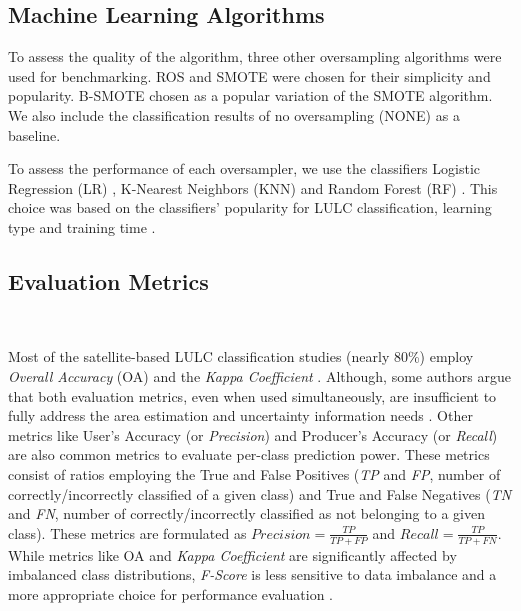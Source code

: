\documentclass[remotesensing,article,submit,moreauthors,pdftex]{Definitions/mdpi}
\begin{document}
\begin{paracol}{2}
\linenumbers
\switchcolumn

\subsection{Machine Learning Algorithms}

To assess the quality of the  algorithm,
three other oversampling algorithms were used for benchmarking. ROS and SMOTE
were chosen for their simplicity and popularity. B-SMOTE chosen as a popular
variation of the SMOTE algorithm. We also include the classification results
of no oversampling (NONE) as a baseline.

To assess the performance of each oversampler, we use the classifiers Logistic
Regression (LR) \cite{Nelder1972}, K-Nearest Neighbors (KNN)
\cite{Cover1967} and Random Forest (RF)
\cite{Liaw2002}. This choice was based on the classifiers' popularity for LULC
classification, learning type and training time \cite{Maxwell2018,Gavade2019}.

\subsection{Evaluation Metrics}~\label{sec:evaluation-metrics}

Most of the satellite-based LULC classification studies (nearly 80\%) employ
\textit{Overall Accuracy} (OA) and the \textit{Kappa Coefficient}
\cite{Gavade2019}. Although, some authors argue that both evaluation metrics,
even when used simultaneously, are insufficient to fully address the area
estimation and uncertainty information needs \cite{Olofsson2013,Pontius2011}.
Other metrics like User's Accuracy (or \textit{Precision}) and Producer's
Accuracy (or \textit{Recall}) are also common metrics to evaluate per-class
prediction power. These metrics consist of ratios employing the True and False
Positives (\textit{TP} and \textit{FP}, number of correctly/incorrectly
classified of a given class) and True and
False Negatives (\textit{TN} and \textit{FN}, number of correctly/incorrectly
classified as not belonging to a given
class). These metrics are formulated as $Precision = \frac{TP}{TP+FP}$ and
$Recall = \frac{TP}{TP+FN}$. While metrics like OA and \textit{Kappa
Coefficient} are significantly affected by imbalanced class distributions,
\textit{F-Score} is less sensitive to data imbalance and a more appropriate
choice for performance evaluation \cite{Jeni2013}.


\end{paracol}
\end{document}

